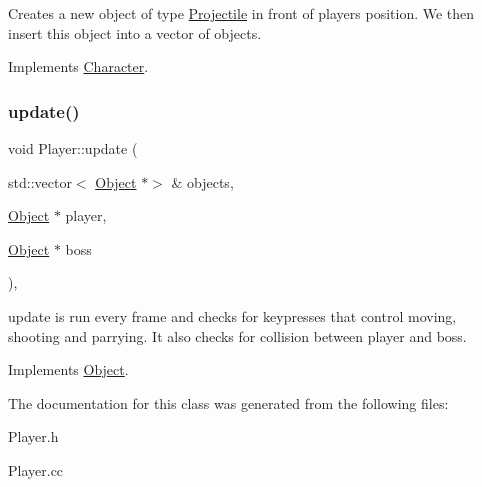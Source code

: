 Creates a new object of type \hyperlink{classProjectile}{Projectile} in front of players position. We then insert this object into a vector of objects. 

Implements \hyperlink{classCharacter}{Character}.

\mbox{\label{classPlayer_a3e780fb5594be0bccbdf363f919a36d7}} 
\subsubsection{\texorpdfstring{update()}{update()}}
{\footnotesize\ttfamily void Player\+::update (\begin{DoxyParamCaption}\item[{std\+::vector$<$ \hyperlink{classObject}{Object} $\ast$$>$ \&}]{objects,  }\item[{\hyperlink{classObject}{Object} $\ast$}]{player,  }\item[{\hyperlink{classObject}{Object} $\ast$}]{boss }\end{DoxyParamCaption})\hspace{0.3cm}{\ttfamily [override]}, {\ttfamily [virtual]}}

update is run every frame and checks for keypresses that control moving, shooting and parrying. It also checks for collision between player and boss. 

Implements \hyperlink{classObject}{Object}.



The documentation for this class was generated from the following files\+:\begin{DoxyCompactItemize}
\item 
Player.\+h\item 
Player.\+cc\end{DoxyCompactItemize}
